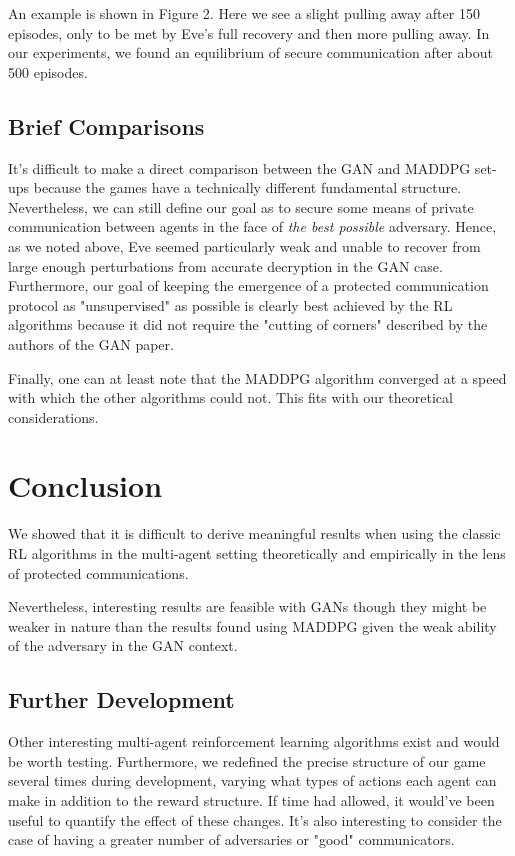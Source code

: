 \documentclass{llncs}
\begin{document}
An example is shown in Figure 2. Here we see a slight pulling away after 150 episodes, only to be met by Eve's full recovery and then more pulling away. In our experiments, we found an equilibrium of secure communication after about 500 episodes. 

\subsection{Brief Comparisons}

It's difficult to make a direct comparison between the GAN and MADDPG set-ups because the games have a technically different fundamental structure. Nevertheless, we can still define our goal as to secure some means of private communication between agents in the face of \textit{the best possible} adversary. Hence, as we noted above, Eve seemed particularly weak and unable to recover from large enough perturbations from accurate decryption in the GAN case. Furthermore, our goal of keeping the emergence of a protected communication protocol as "unsupervised" as possible is clearly best achieved by the RL algorithms because it did not require the "cutting of corners" described by the authors of the GAN paper. 

Finally, one can at least note that the MADDPG algorithm converged at a speed with which the other algorithms could not. This fits with our theoretical considerations. 

\section{Conclusion}

We showed that it is difficult to derive meaningful results when using the classic RL algorithms in the multi-agent setting theoretically and empirically in the lens of protected communications. 

Nevertheless, interesting results are feasible with GANs though they might be weaker in nature than the results found using MADDPG given the weak ability of the adversary in the GAN context. 
\subsection{Further Development}

Other interesting multi-agent reinforcement learning algorithms exist and would be worth testing\cite{gupta2017cooperative}. Furthermore, we redefined the precise structure of our game several times during development, varying what types of actions each agent can make in addition to the reward structure. If time had allowed, it would've been useful to quantify the effect of these changes. It's also interesting to consider the case of having a greater number of adversaries or "good" communicators. 
\end{document}
